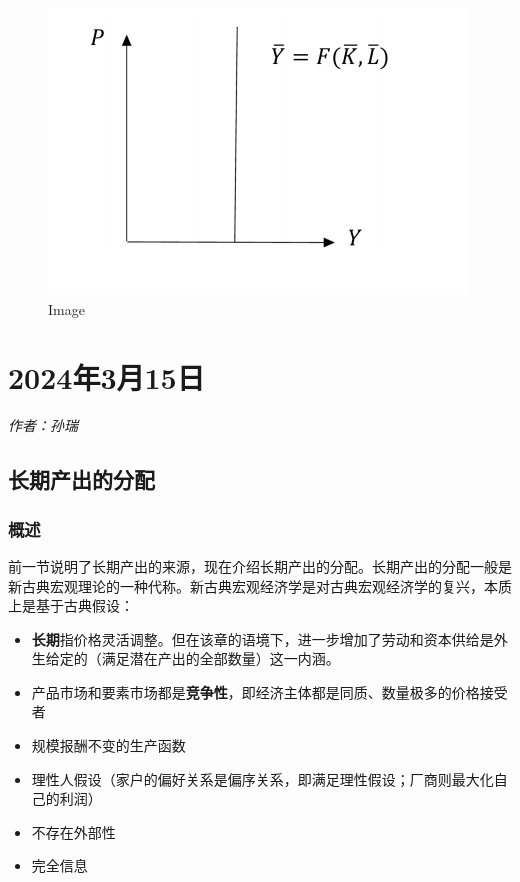 \documentclass[
  11pt,
  letterpaper,
]{ctexbook}
\providecommand{\tightlist}{%
  \setlength{\itemsep}{0pt}\setlength{\parskip}{0pt}}\usepackage{longtable,booktabs,array}
\begin{document}
\begin{figure}[H]

{\centering \includegraphics{figures/1-2.png}

}

\caption{Image}

\end{figure}%


\chapter{2024年3月15日}\label{ux5e743ux670815ux65e5}

\emph{作者：孙瑞}

\section{长期产出的分配}\label{ux957fux671fux4ea7ux51faux7684ux5206ux914d}

\subsection{概述}\label{ux6982ux8ff0}

前一节说明了长期产出的来源，现在介绍长期产出的分配。长期产出的分配一般是新古典宏观理论的一种代称。新古典宏观经济学是对古典宏观经济学的复兴，本质上是基于古典假设：

\begin{itemize}
\tightlist
\item
  \textbf{长期}指价格灵活调整。但在该章的语境下，进一步增加了劳动和资本供给是外生给定的（满足潜在产出的全部数量）这一内涵。
\item
  产品市场和要素市场都是\textbf{竞争性}，即经济主体都是同质、数量极多的价格接受者
\item
  规模报酬不变的生产函数
\item
  理性人假设（家户的偏好关系是偏序关系，即满足理性假设；厂商则最大化自己的利润）
\item
  不存在外部性
\item
  完全信息
\end{itemize}
\end{document}
